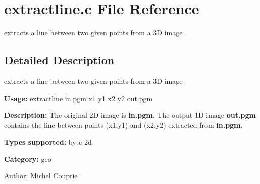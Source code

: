 \section{extractline.c File Reference}
\label{extractline_8c}
extracts a line between two given points from a 3D image 



\subsection{Detailed Description}
extracts a line between two given points from a 3D image 

{\bf Usage:} extractline in.pgm x1 y1 x2 y2 out.pgm

{\bf Description:} The original 2D image is {\bf in.pgm}. The output 1D image {\bf out.pgm} contains the line between points (x1,y1) and (x2,y2) extracted from {\bf in.pgm}.

{\bf Types supported:} byte 2d

{\bf Category:} geo

\begin{Desc}
\item[Author:]Michel Couprie \end{Desc}
